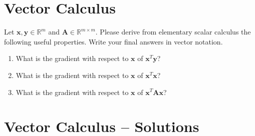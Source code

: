 \documentclass[submit]{harvardml}
\newcommand{\R}{\mathbb{R}}
\renewcommand{\v}[1]{\mathbf{#1}}
\begin{document}
\newpage
\section*{Vector Calculus}
\begin{problem}
  Let $\v x, \v y \in \R^m$ and $\v A \in \R^{m \times m}$. Please derive from
  elementary scalar calculus the following useful properties. Write
  your final answers in vector notation.
\begin{enumerate}[label=(\alph*)]
    \item What is the gradient with respect to $\v x$ of $\v x^T \v y$?
    \item What is the gradient with respect to $\v x$ of $\v x^T \v x$?
    \item What is the gradient with respect to $\v x$ of $\v x^T \v A \v x$?
\end{enumerate}
\end{problem}

\section*{Vector Calculus -- Solutions}
\end{document}
